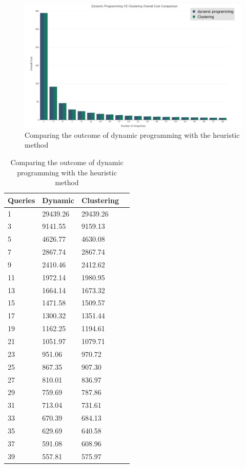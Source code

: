 \begin{figure}
	\label{fig:dynamic_vs_heuristic}
	\centering
	\includegraphics[width=\textwidth]{figs/dynamic_vs_clustering.jpg}
	\caption{Comparing the outcome of dynamic programming with the heuristic method}
\end{figure} 

\begin {center}
\begin{table}
	\centering
	\caption{Comparing the outcome of dynamic programming with the heuristic method}
	\label {table:dynamic_vs_heuristic}
	\begin{tabular}{p{2cm}p{3cm}p{3cm}p{3cm}}
		\hline
		Queries  & Dynamic  & Clustering \\ \hline
		1 & 29439.26  & 29439.26  \\  
		3 & 9141.55  & 9159.13  \\
		5 & 4626.77  & 4630.08  \\
		7 & 2867.74  & 2867.74  \\
		9 & 2410.46  & 2412.62 \\
		11 & 1972.14  & 1980.95  \\
		13 & 1664.14  & 1673.32  \\
		15 & 1471.58  & 1509.57  \\
		17 & 1300.32  & 1351.44  \\
		19 & 1162.25  & 1194.61  \\
		21 & 1051.97  & 1079.71  \\
		23 & 951.06  & 970.72  \\
		25 & 867.35  & 907.30  \\
		27 & 810.01  & 836.97  \\
		29 & 759.69  & 787.86  \\
		31 & 713.04  & 731.61  \\
		33 & 670.39  & 684.13  \\
		35 & 629.69  & 640.58  \\
		37 & 591.08  & 608.96  \\
		39 & 557.81  & 575.97  \\\hline
	\end{tabular}
\end{table}
\end{center}

